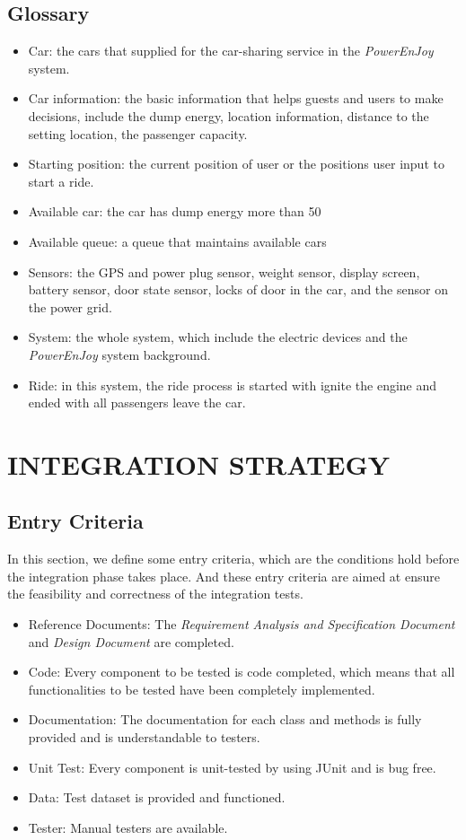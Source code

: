 \documentclass[a4paper,11pt]{article}
\begin{document}
	\subsection{Glossary}
	\begin{itemize}
	\item Car: the cars that supplied for the car-sharing service in the \textsl{PowerEnJoy} system.
	\item Car information: the basic information that helps guests and users to make decisions, include the dump energy, location information, distance to the setting location, the passenger capacity.
	\item Starting position: the current position of user or the positions user input to start a ride.
	\item Available car: the car has dump energy more than 50%
	\item Available queue: a queue that maintains available cars 
	\item Sensors: the GPS and power plug sensor, weight sensor, display screen, battery sensor, door state sensor, locks of door in the car, and the sensor on the power grid. 
	\item System: the whole system, which include the electric devices and the \textsl{PowerEnJoy} system background.
	\item Ride: in this system, the ride process is started with ignite the engine and ended with all passengers leave the car.

	\end{itemize}
	
\newpage
\section{INTEGRATION STRATEGY}
	\subsection{Entry Criteria}
	In this section, we define some entry criteria, which are the conditions hold before the integration phase takes place. And these entry criteria are aimed at ensure the feasibility and correctness of the integration tests.	
	\begin{itemize}
		\item Reference Documents: The \textsl{Requirement Analysis and Specification Document} and \textsl{Design Document} are completed.
		\item Code: Every component to be tested is code completed, which means that all functionalities to be tested have been completely implemented.		
		\item Documentation: The documentation for each class and methods is fully provided and is understandable to testers.
		\item Unit Test: Every component is unit-tested by using JUnit and is bug free.
		\item Data: Test dataset is provided and functioned. 
		\item Tester: Manual testers are available. 
	\end{itemize}		
\end{document}
